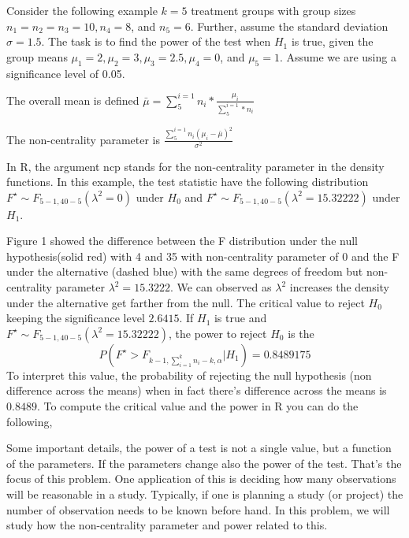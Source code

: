 \documentclass{article}
\begin{document}
Consider the following example $k = 5$ treatment groups with group sizes $n_1 = n_2 = n_3 = 10, n_4 = 8$,
and $n_5 = 6$. Further, assume the standard deviation $\sigma = 1.5$. The task is to find the power of the
test when $H_1$ is true, given the group means $\mu_1 = 2, \mu_2 = 3, \mu_3 = 2.5, \mu_4 = 0$, and $\mu_5 = 1$. Assume
we are using a significance level of 0.05.

The overall mean is defined $\bar{\mu}= \sum_{5}^{i=1}n_i*\frac{\mu_i}{\sum_{5}^{i=1}*n_i}$

The non-centrality parameter is $\frac{\sum_{5}^{i=1}n_i(\mu_i-\bar{\mu})^2}{\sigma^2}$

In R, the argument ncp stands for the non-centrality parameter in the density functions. In this example, the test statistic
have the following distribution $F^\star \sim F_{5-1,40-5}(\lambda^2=0)$ under $H_0$ and $F^\star \sim F_{5-1,40-5}(\lambda^2 = 15.32222)$ under $H_1$.

Figure 1 showed the difference between the F distribution under the null hypothesis(solid red) with
4 and 35 with non-centrality parameter of 0 and the F under the alternative (dashed blue) with
the same degrees of freedom but non-centrality parameter $\lambda^2 = 15.3222$. We can observed as $\lambda^2$
increases the density under the alternative get farther from the null. The critical value to reject $H_0$
keeping the significance level $2.6415$. If $H_1$ is true and $F^\star \sim F_{5-1,40-5}(\lambda^2 = 15.32222)$, the power
to reject $H_0$ is the
$$
	P(F^\star>F_{k-1,\sum_{i=1}^{k}n_i-k,\alpha}|H_1)=0.8489175
$$
To interpret this value, the probability of rejecting the null hypothesis (non difference across the
means) when in fact there’s difference across the means is $0.8489$. To compute the critical value
and the power in R you can do the following,

Some important details, the power of a test is not a single value, but a function of the parameters.
If the parameters change also the power of the test.
That’s the focus of this problem. One application of this is deciding how many observations will be
reasonable in a study. Typically, if one is planning a study (or project) the number of observation
needs to be known before hand. In this problem, we will study how the non-centrality parameter
and power related to this.
\end{document}
